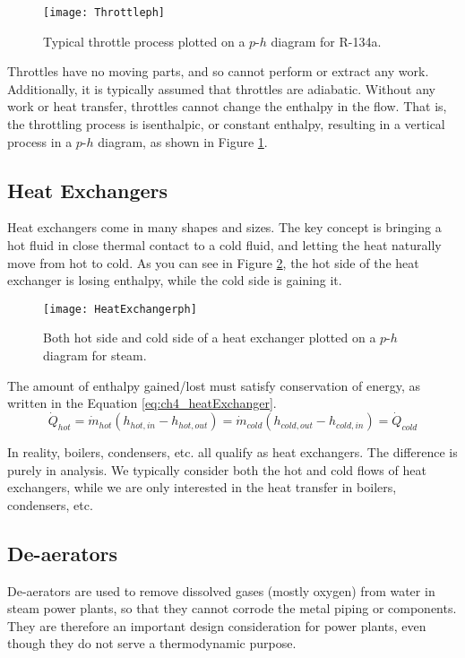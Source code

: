 \begin{figure}[H]
\centering
\texttt{[image: Throttleph]}
\caption{Typical throttle process plotted on a $p$-$h$ diagram for R-134a.}
\label{fig:ch4_throttleph}
\end{figure}

Throttles have no moving parts, and so cannot perform or extract any work.  Additionally, it is typically assumed that throttles are adiabatic.  Without any work or heat transfer, throttles cannot change the enthalpy in the flow.  That is, the throttling process is isenthalpic, or constant enthalpy, resulting in a vertical process in a $p$-$h$ diagram, as shown in Figure \ref{fig:ch4_throttleph}.
\subsection{Heat Exchangers}  \label{sec:ch4_heatExchangers}

Heat exchangers come in many shapes and sizes.  The key concept is bringing a hot fluid in close thermal contact to a cold fluid, and letting the heat naturally move from hot to cold.  As you can see in Figure \ref{fig:ch4_heatexchangerph}, the hot side of the heat exchanger is losing enthalpy, while the cold side is gaining it.  
\begin{figure}[H]
\centering
\texttt{[image: HeatExchangerph]}
\caption{Both hot side and cold side of a heat exchanger plotted on a $p$-$h$ diagram for steam.}
\label{fig:ch4_heatexchangerph}
\end{figure}

The amount of enthalpy gained/lost must satisfy conservation of energy, as written in the Equation \ref{eq:ch4_heatExchanger}.
\begin{equation} \label{eq:ch4_heatExchanger}
  \dot{Q}_{hot} = \dot{m}_{hot} \left(h_{hot, in} - h_{hot, out}\right) = \dot{m}_{cold} \left(h_{cold, out} - h_{cold, in}\right) = \dot{Q}_{cold}
\end{equation}

In reality, boilers, condensers, etc. all qualify as heat exchangers.  The difference is purely in analysis.  We typically consider both the hot and cold flows of heat exchangers, while we are only interested in the heat transfer in boilers, condensers, etc.
\subsection{De-aerators}  \label{sec:ch4_deaerators}
De-aerators are used to remove dissolved gases (mostly oxygen) from water in steam power plants, so that they cannot corrode the metal piping or components.  They are therefore an important design consideration for power plants, even though they do not serve a thermodynamic purpose.

